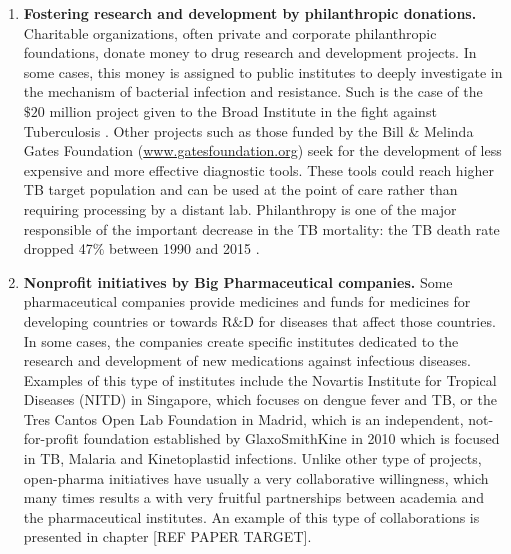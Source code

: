 \documentclass[12pt, a4paper,twoside]{tesi_upf}
\begin{document}
\begin{enumerate}

\item \textbf{Fostering research and development by philanthropic donations.} Charitable organizations, often private and corporate philanthropic foundations, donate money to drug research and development projects. In some cases, this money is assigned to public institutes to deeply investigate in the mechanism of bacterial infection and resistance. Such is the case of the $\$20$ million  project given to the Broad Institute in the fight against Tuberculosis \cite{BroadInstitute}. Other projects such as those funded by the Bill $\&$ Melinda Gates Foundation (\url{www.gatesfoundation.org}) seek for the development of less expensive and more effective diagnostic tools. These tools could reach higher TB target population and can be used at the point of care rather than requiring processing by a distant lab. Philanthropy is one of the major responsible of the important decrease in the TB mortality: the TB death rate dropped 47$\%$ between 1990 and 2015 \cite{Lewandowski2015}. 

\item \textbf{Nonprofit initiatives by Big Pharmaceutical companies.} Some pharmaceutical companies provide medicines and funds for medicines for developing countries or towards R$\&$D for diseases that affect those countries. In some cases, the companies create specific institutes dedicated to the research and development of new medications against infectious diseases. Examples of this type of institutes include the Novartis Institute for Tropical Diseases (NITD) in Singapore, which focuses on dengue fever and TB, or the Tres Cantos Open Lab Foundation in Madrid, which is an independent, not-for-profit foundation established by GlaxoSmithKine in 2010 which is focused in TB, Malaria and Kinetoplastid infections. Unlike other type of projects, open-pharma initiatives have usually a very collaborative willingness, which many times results a with very fruitful partnerships between academia and the pharmaceutical institutes. An example of this type of collaborations is presented in chapter [REF PAPER TARGET].


\end{enumerate}
\end{document}
